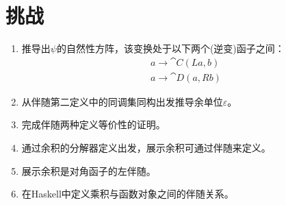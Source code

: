 \section{挑战}

\begin{enumerate}
  \tightlist
  \item
        推导出$\psi$的自然性方阵，该变换处于以下两个(逆变)函子之间：
        \begin{gather*}
          a \to \cat{C}(L a, b) \\
          a \to \cat{D}(a, R b)
        \end{gather*}
  \item
        从伴随第二定义中的同调集同构出发推导余单位$\varepsilon$。
  \item
        完成伴随两种定义等价性的证明。
  \item
        通过余积的分解器定义出发，展示余积可通过伴随来定义。
  \item
        展示余积是对角函子的左伴随。
  \item
        在Haskell中定义乘积与函数对象之间的伴随关系。
\end{enumerate}